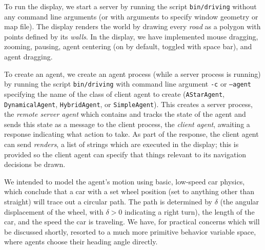 \documentclass{article}
\newcommand{\code}{\texttt}
\begin{document}
To run the display, we start a server by running the script \code{bin/driving}
without any command line arguments (or with arguments to specify window geometry
or map file). The display renders the world by drawing every \emph{road} as a
polygon with points defined by its \emph{walls}. In the display, we have
implemented mouse dragging, zooming, pausing, agent centering (on by default,
toggled with space bar), and agent dragging.

To create an agent, we create an agent process (while a server process is
running) by running the script \code{bin/driving} with command line argument
\code{-c} or \code{--agent} specifying the name of the class of client agent to
create (\code{AStarAgent}, \code{DynamicalAgent}, \code{HybridAgent}, or
\code{SimpleAgent}). This creates a server process, the \emph{remote server
  agent} which contains and tracks the state of the agent and sends this state
as a message to the client process, the \emph{client agent}, awaiting a response
indicating what action to take. As part of the response, the client agent
can send \emph{renders}, a list of strings which are executed in the display;
this is provided so the client agent can specify that things relevant to
its navigation decisions be drawn.

We intended to model the agent's motion using basic, low-speed car physics,
which conclude that a car with a set wheel position (set to anything other than
straight) will trace out a circular path. The path is determined by $\delta$
(the angular displacement of the wheel, with $\delta>0$ indicating a right
turn), the length of the car, and the speed the car is traveling. We have, for
practical concerns which will be discussed shortly, resorted to a much more
primitive behavior variable space, where agents choose their heading angle
directly.
\end{document}
